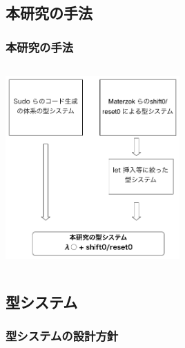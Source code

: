 \documentclass[dvipdfmx,cjk,xcolor=dvipsnames,envcountsect,notheorems,12pt]{beamer}
\theoremstyle{definition}
\begin{document}


\subsection{本研究の手法}
\begin{frame}
  \frametitle{本研究の手法}
  \begin{columns}
    \begin{column}{1.\textwidth}%
      \center
      \includegraphics[clip,height=7cm]{./img/type_system_me.png}
    \end{column}
  \end{columns}
\end{frame}

\subsection{型システム}
\begin{frame}
  \frametitle{型システムの設計方針}

\end{frame}
\end{document}
